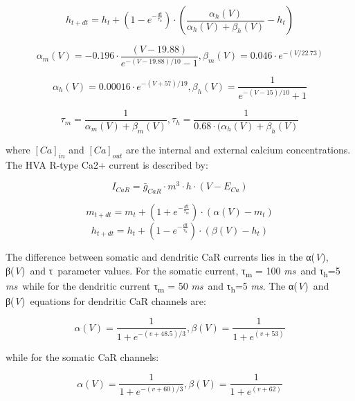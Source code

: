 \documentclass[a4paper]{article}
\begin{document}
\begin{equation}
h_{t+dt}=h_t+(1-e^{-\frac{dt}{τ_h}})\cdot
(\frac{α_h(V)}{α_h(V)+β_h(V)}-h_t)
\end{equation}

\begin{equation}
α_m(V)=-0.196\cdot \frac{(V-19.88)}{e^{-(V-19.88)/10}-1},β_m(V)=0.046\cdot e^{-(V/22.73)}
\end{equation}

\begin{equation}
α_h(V)=0.00016\cdot e^{-(V+57)/19},β_h(V)=\frac 1{e^{-(V-15)/10}+1}
\end{equation}

\begin{equation}
τ_m=\frac {1}{α_m(V)+β_m(V)},τ_h=\frac {1}{0.68\cdot (α_h(V)+β_h(V)}
\end{equation}

where
$[Ca]_{in}$ and $[Ca]_{out}$ are the
internal and external calcium concentrations. The HVA R-type Ca2+ current is described by:


\begin{equation}
I_{CaR}=\bar g_{CaR}\cdot m^3\cdot h\cdot
(V-E_{Ca})
\end{equation}

\begin{equation}
m_{t+dt}=m_t+(1+e^{-\frac{dt}{τ_m}})\cdot (α(V)-m_t)
\end{equation}
\begin{equation}
h_{t+dt}=h_t+(1-e^{-\frac{dt}{τ_h}})\cdot (β(V)-h_t)
\end{equation}

The difference between somatic and dendritic CaR currents lies in the α(\textit{V}), β(\textit{V})~and τ~parameter
values. For the somatic current, τ\textsubscript{m}\textit{ }=\textit{ }100\textit{ ms}~and
τ\textsubscript{h}=5\textit{ ms}~while for the dendritic current τ\textsubscript{m}\textit{ }=\textit{ }50\textit{
ms}~and τ\textsubscript{h}=5\textit{ ms}. The α(\textit{V})~and β(\textit{V})~equations for dendritic CaR channels are:


\begin{equation}
α(V)=\frac 1{1+e^{-(v+48.5)/3}},β(V)=\frac 1{1+e^{(v+53)}}
\end{equation}

while for the somatic CaR channels:


\begin{equation}
α(V)=\frac 1{1+e^{-(v+60)/3}},β(V)=\frac 1{1+e^{(v+62)}}
\end{equation}
\end{document}
